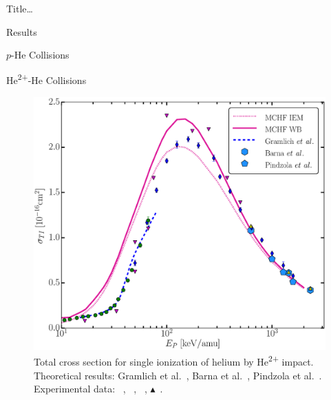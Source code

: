 \documentclass[letterpaper, 11 pt]{report}
\begin{document}
\begin{chapter}{ Title\dots \label{chap:p-he2p-he}}
\begin{section}{Results \label{sec:phe2p-res}}
\begin{subsection}{\texorpdfstring{$p$}{p}-He Collisions \label{sec:phe-res}}
      \end{subsection}

      \begin{subsection}{\texorpdfstring{He\textsuperscript{2+}}{He2+}-He Collisions 
                         \label{sec:he2phe-res}}

         \begin{figure}[ht]
            \begin{minipage}{.49\linewidth}
               
               \centering
               \includegraphics[width = \linewidth]{./images/he2phe/he2phe-TI.eps}
               \caption[Total cross section for single ionization of helium by He\textsuperscript{2+}
                        impact.]{Total cross section for single ionization of helium by
                        He\textsuperscript{2+} impact. Theoretical results: Gramlich
                        et al.~\cite{GGS-89}, Barna
                        et al.~\cite{BTB-05}, Pindzola et al.~\cite{PRC-07}.
                        Experimental data: {\color{blue}{$\blacklozenge$}}~\cite{SG85},
                        {\color{OliveGreen}{$\bullet$}}~\cite{SG89},
                        {\color{RedViolet}{$\blacktriangledown$}}~\cite{Dubois87},
                        {\color{GreenYellow}$\blacktriangle$}~\cite{KAH84}. \label{fig:he2phe-ti}}
            \end{minipage} \hspace{0.04\linewidth} %
            \begin{minipage}{.49\linewidth}


\end{minipage}
\end{figure}
\end{subsection}
\end{section}
\end{chapter}
\end{document}
